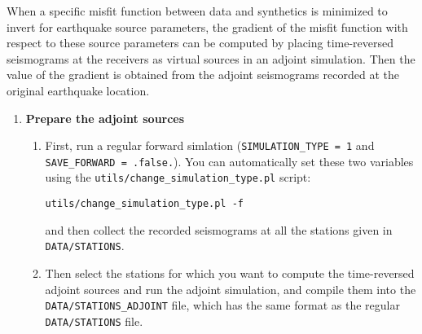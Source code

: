 When a specific misfit function between data and synthetics is minimized to invert
for earthquake source parameters, the gradient of the misfit function
with respect to these source parameters can be computed by placing
time-reversed seismograms at the receivers as virtual sources
in an adjoint simulation. Then the value of the gradient is obtained
from the adjoint seismograms recorded at the original earthquake location.
\begin{enumerate}
\item \textbf{Prepare the adjoint sources} \label{enu:Prepare-the-adjoint}

\begin{enumerate}
\item First, run a regular forward simlation (\texttt{SIMULATION\_TYPE =
1} and \texttt{SAVE\_FORWARD = .false.}). You can automatically set
these two variables using the \texttt{\small utils/change\_simulation\_type.pl}{\small{}
script:}{\small \par}
\begin{verbatim}
utils/change_simulation_type.pl -f
\end{verbatim}

and then collect the recorded seismograms at all the stations given
in \texttt{DATA/STATIONS}.

\item Then select the stations for which you want to compute the time-reversed
adjoint sources and run the adjoint simulation, and compile them into
the \texttt{DATA/STATIONS\_ADJOINT} file, which has the same format
as the regular \texttt{DATA/STATIONS} file.


\end{enumerate}
\end{enumerate}
